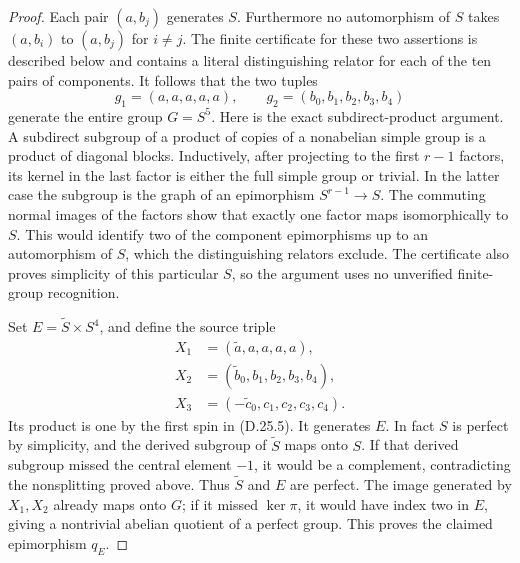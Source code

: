 \begin{proof}
Each pair $(a,b_j)$ generates $S$.  Furthermore no automorphism
of $S$ takes $(a,b_i)$ to $(a,b_j)$ for $i\ne j$.  The finite
certificate for these two assertions is described below and
contains a literal distinguishing relator for each of the ten
pairs of components.  It follows that the two tuples
\[
 g_1=(a,a,a,a,a),\qquad
 g_2=(b_0,b_1,b_2,b_3,b_4)
 \tag{D.25.6}
\]
generate the entire group $G=S^5$.  Here is the exact
subdirect-product argument.  A subdirect subgroup of a product
of copies of a nonabelian simple group is a product of diagonal
blocks.  Inductively, after projecting to the first $r-1$
factors, its kernel in the last factor is either the full
simple group or trivial.  In the latter case the subgroup is
the graph of an epimorphism $S^{r-1}\to S$.  The commuting
normal images of the factors show that exactly one factor
maps isomorphically to $S$.  This would identify two of the
component epimorphisms up to an automorphism of $S$, which
the distinguishing relators exclude.  The certificate also
proves simplicity of this particular $S$, so the argument
uses no unverified finite-group recognition.

Set $E=\widetilde S\times S^4$, and define the source triple
\[
 \begin{split}
 X_1&=(\widetilde a,a,a,a,a),\\
 X_2&=(\widetilde b_0,b_1,b_2,b_3,b_4),\\
 X_3&=(-\widetilde c_0,c_1,c_2,c_3,c_4).
 \end{split}
 \tag{D.25.7}
\]
Its product is one by the first spin in \textup{(D.25.5)}.
It generates $E$.  In fact $S$ is perfect by simplicity, and
the derived subgroup of $\widetilde S$ maps onto $S$.
If that derived subgroup missed the central element $-1$,
it would be a complement, contradicting the nonsplitting
proved above.  Thus $\widetilde S$ and $E$ are perfect.
The image generated by $X_1,X_2$ already maps onto $G$; if it
missed $\ker\pi$, it would have index two in $E$, giving a
nontrivial abelian quotient of a perfect group.  This proves
the claimed epimorphism $q_E$.


\end{proof}
